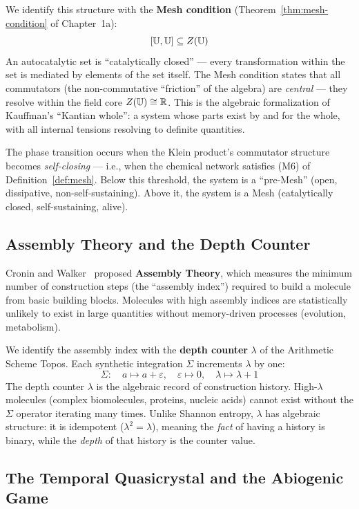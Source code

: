 We identify this structure with the \textbf{Mesh condition} (Theorem~\ref{thm:mesh-condition} of Chapter~1a):
$$[\mathbb{U}, \mathbb{U}] \subseteq Z(\mathbb{U})$$
An autocatalytic set is ``catalytically closed'' --- every transformation within the set is mediated by elements of the set itself. The Mesh condition states that all commutators (the non-commutative ``friction'' of the algebra) are \emph{central} --- they resolve within the field core $Z(\mathbb{U}) \cong \mathbb{R}$. This is the algebraic formalization of Kauffman's ``Kantian whole'': a system whose parts exist by and for the whole, with all internal tensions resolving to definite quantities.

The phase transition occurs when the Klein product's commutator structure becomes \emph{self-closing} --- i.e., when the chemical network satisfies (M6) of Definition~\ref{def:mesh}. Below this threshold, the system is a ``pre-Mesh'' (open, dissipative, non-self-sustaining). Above it, the system is a Mesh (catalytically closed, self-sustaining, alive).

\subsection{Assembly Theory and the Depth Counter}

Cronin and Walker~\cite{cronin2023} proposed \textbf{Assembly Theory}, which measures the minimum number of construction steps (the ``assembly index'') required to build a molecule from basic building blocks. Molecules with high assembly indices are statistically unlikely to exist in large quantities without memory-driven processes (evolution, metabolism).

We identify the assembly index with the \textbf{depth counter} $\lambda$ of the Arithmetic Scheme Topos. Each synthetic integration $\Sigma$ increments $\lambda$ by one:
$$\Sigma: \quad a \mapsto a + \varepsilon, \quad \varepsilon \mapsto 0, \quad \lambda \mapsto \lambda + 1$$
The depth counter $\lambda$ is the algebraic record of construction history. High-$\lambda$ molecules (complex biomolecules, proteins, nucleic acids) cannot exist without the $\Sigma$ operator iterating many times. Unlike Shannon entropy, $\lambda$ has algebraic structure: it is idempotent ($\lambda^2 = \lambda$), meaning the \emph{fact} of having a history is binary, while the \emph{depth} of that history is the counter value.

\subsection{The Temporal Quasicrystal and the Abiogenic Game}

